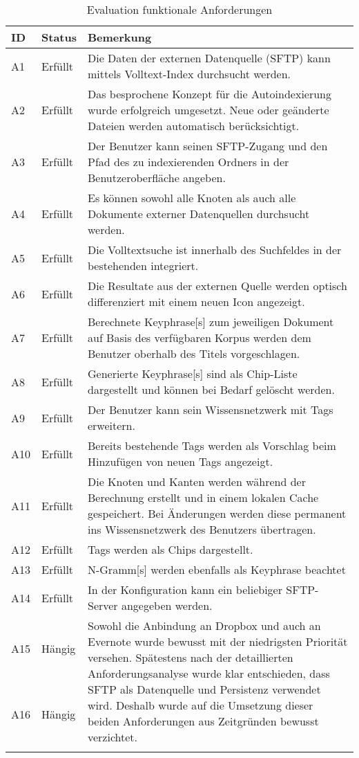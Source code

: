 \begin{longtable}{|p{1.5cm} | p{1.5cm} | p{8.1cm}|}
  \hline
    ID & Status & Bemerkung \\\hline
    A1 & Erfüllt & Die Daten der externen Datenquelle (\gls{SFTP}) kann mittels Volltext-Index durchsucht werden.\\\hline
    A2 & Erfüllt & Das besprochene Konzept für die Autoindexierung wurde erfolgreich umgesetzt. Neue oder geänderte Dateien werden automatisch berücksichtigt.\\\hline
    A3 & Erfüllt & Der Benutzer kann seinen \gls{SFTP}-Zugang und den Pfad des zu indexierenden Ordners in der Benutzeroberfläche angeben. \\\hline
    A4 & Erfüllt & Es können sowohl alle Knoten als auch alle Dokumente externer Datenquellen durchsucht werden. \\\hline
    A5 & Erfüllt & Die Volltextsuche ist innerhalb des Suchfeldes in der bestehenden integriert. \\\hline
    A6 & Erfüllt & Die Resultate aus der externen Quelle werden optisch differenziert mit einem neuen Icon angezeigt. \\\hline
    A7 & Erfüllt & Berechnete \gls{Keyphrase}[s] zum jeweiligen Dokument auf Basis des verfügbaren Korpus werden dem Benutzer oberhalb des Titels vorgeschlagen. \\\hline
    A8 & Erfüllt & Generierte \gls{Keyphrase}[s] sind als Chip-Liste dargestellt und können bei Bedarf gelöscht werden.\\\hline
    A9 & Erfüllt & Der Benutzer kann sein Wissensnetzwerk mit Tags erweitern.\\\hline
    A10 & Erfüllt & Bereits bestehende Tags werden als Vorschlag beim Hinzufügen von neuen Tags angezeigt.\\\hline
    A11 & Erfüllt & Die Knoten und Kanten werden während der Berechnung erstellt und in einem lokalen Cache gespeichert. Bei Änderungen werden diese permanent ins Wissensnetzwerk des Benutzers übertragen.\\\hline
    A12 & Erfüllt & Tags werden als Chips dargestellt.\\\hline
    A13 & Erfüllt & \gls{N-Gramm}[s] werden ebenfalls als \gls{Keyphrase} beachtet\\\hline
    A14 & Erfüllt & In der Konfiguration kann ein beliebiger \gls{SFTP}-Server angegeben werden.  \\\hline
    \newpage
    \hline
    A15 & Hängig & \multirow{2}{8.1cm}{Sowohl die Anbindung an Dropbox und auch an Evernote wurde bewusst mit der niedrigsten Priorität versehen. Spätestens nach der detaillierten Anforderungsanalyse wurde klar entschieden, dass \gls{SFTP} als Datenquelle und Persistenz verwendet wird. Deshalb wurde auf die Umsetzung dieser beiden Anforderungen aus Zeitgründen bewusst verzichtet.}\\\cline{1-2}
    A16 & Hängig & \\[4cm]\hline
    \caption{Evaluation funktionale Anforderungen}
  \label{tab:funktionale-anforderungen-eval}
\end{longtable}


